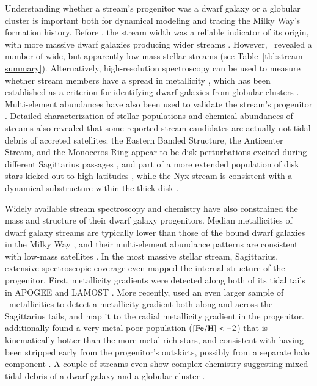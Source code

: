 \documentclass[final,5p,times,twocolumn,authoryear]{elsarticle}
\begin{document}
Understanding whether a stream's progenitor was a dwarf galaxy or a globular cluster is important both for dynamical modeling and tracing the Milky Way's formation history.
Before \gaia, the stream width was a reliable indicator of its origin, with more massive dwarf galaxies producing wider streams \citep[e.g.,][]{belokurov:2006, bonaca:2012}.
However, \gaia\ revealed a number of wide, but apparently low-mass stellar streams (see Table~\ref{tbl:stream-summary}).
Alternatively, high-resolution spectroscopy can be used to measure whether stream members have a spread in metallicity \citep[e.g.,][]{ji:2020,chandra:2022}, which has been established as a criterion for identifying dwarf galaxies from globular clusters \citep{willman:2012}.
Multi-element abundances have also been used to validate the stream's progenitor \citep[e.g., NGC~3201 as the progenitor of the Gj\" ol stream,][]{hansen:2020}.
Detailed characterization of stellar populations and chemical abundances of streams also revealed that some reported stream candidates are actually not tidal debris of accreted satellites: the Eastern Banded Structure, the Anticenter Stream, and the Monoceros Ring appear to be disk perturbations excited during different Sagittarius passages \citep[cf.][]{deason:2018, laporte:2020}, and part of a more extended population of disk stars kicked out to high latitudes \citep{price-whelan:2015,bergemann:2018,laporte:2018}, while the Nyx stream is consistent with a dynamical substructure within the thick disk \citep[cf.][]{zucker:2021,wang:2023}.

Widely available stream spectroscopy and chemistry have also constrained the mass and structure of their dwarf galaxy progenitors.
Median metallicities of dwarf galaxy streams are typically lower than those of the bound dwarf galaxies in the Milky Way \citep{li:2022}, and their multi-element abundance patterns are consistent with low-mass satellites \citep[$\approx10^6\,\unit{\msun}$,][]{ji:2020,hawkins:2023}.
In the most massive stellar stream, Sagittarius, extensive spectroscopic coverage even mapped the internal structure of the progenitor.
First, metallicity gradients were detected along both of its tidal tails in APOGEE \citep{hayes:2020} and LAMOST \citep{zhao:2020}.
More recently, \citet{cunningham:2024} used an even larger sample of \gaia\ metallicities \citep{andrae:2023} to detect a metallicity gradient both along and across the Sagittarius tails, and map it to the radial metallicity gradient in the progenitor.
\citet{johnson:2020} additionally found a very metal poor population (${[\mathrm{Fe}/\mathrm{H}]}<-2$) that is kinematically hotter than the more metal-rich stars, and consistent with having been stripped early from the progenitor's outskirts, possibly from a separate halo component \citep[see also][]{limberg:2023}.
A couple of streams even show complex chemistry suggesting mixed tidal debris of a dwarf galaxy and a globular cluster \citep{hansen:2021,limberg:2024}.
\end{document}
